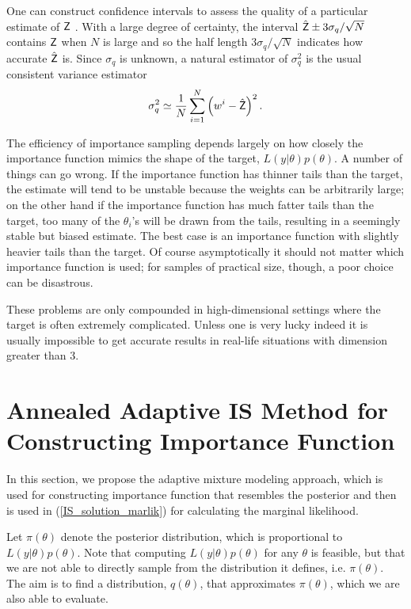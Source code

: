 One can construct confidence intervals to assess the quality of a
particular estimate of $\textsf{Z}$ \citep{lefebvre2009path}. With a large
degree of certainty, the interval $\hat{\textsf{Z}}\pm3\sigma_q/\sqrt{N}$
contains $\textsf{Z}$ when $N$ is large and so the half length
$3\sigma_q/\sqrt{N}$ indicates how accurate $\hat{\textsf{Z}}$ is. Since
$\sigma_q$ is unknown, a natural estimator of $\sigma_q^2$ is the
usual consistent variance estimator
\begin{equation}
\sigma_q^2\simeq\frac{1}{N}\sum\limits_{i=1}^N\left(w^i-\hat{\Z}\right)^2.
\end{equation}

The efficiency of importance sampling depends largely on how closely
the importance function mimics the shape of the target,
$L(y|\theta)p(\theta)$. A number of things can go wrong. If the
importance function has thinner tails than the target, the estimate
will tend to be unstable because the weights can be arbitrarily
large; on the other hand if the importance function has much fatter
tails than the target, too many of the $\theta_i$'s will be drawn
from the tails, resulting in a seemingly stable but biased estimate.
The best case is an importance function with slightly heavier tails
than the target. Of course asymptotically it should not matter which
importance function is used; for samples of practical size, though,
a poor choice can be disastrous.

These problems are only compounded in high-dimensional settings
where the target is often extremely complicated. Unless one is very
lucky indeed it is usually impossible to get accurate results in
real-life situations with dimension greater than 3.

\section{Annealed Adaptive IS Method for Constructing Importance
  Function} \label{sec:AAIS}
In this section, we propose the adaptive mixture modeling approach,
which is used for constructing importance function that resembles
the posterior and then is used in (\ref{IS_solution_marlik}) for
calculating the marginal likelihood.

Let $\pi(\theta)$ denote the posterior distribution, which is
proportional to $L(y|\theta)p(\theta)$. Note that computing
$L(y|\theta)p(\theta)$ for any $\theta$ is feasible, but that we are
not able to directly sample from the distribution it defines, i.e.
$\pi(\theta)$. The aim is to find a distribution, $q(\theta)$, that
approximates $\pi(\theta)$, which we are also able to evaluate.

